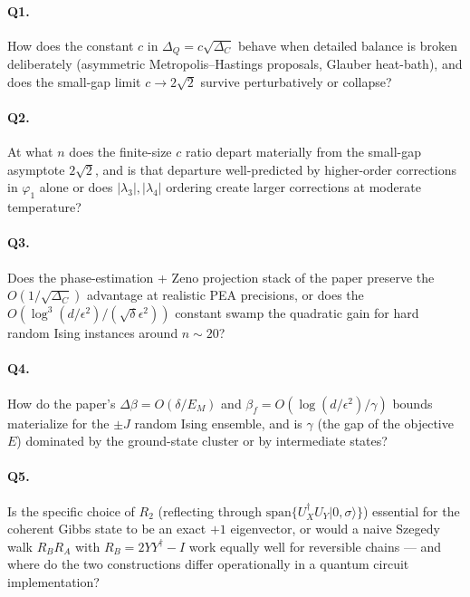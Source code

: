 \documentclass[11pt]{article}
\begin{document}
\paragraph{Q1.} How does the constant $c$ in $\Delta_Q = c\sqrt{\Delta_C}$
behave when detailed balance is broken deliberately (asymmetric
Metropolis--Hastings proposals, Glauber heat-bath), and does the small-gap
limit $c \to 2\sqrt{2}$ survive perturbatively or collapse?

\paragraph{Q2.} At what $n$ does the finite-size $c$ ratio depart materially
from the small-gap asymptote $2\sqrt{2}$, and is that departure well-predicted
by higher-order corrections in $\varphi_1$ alone or does $|\lambda_3|, |\lambda_4|$
ordering create larger corrections at moderate temperature?

\paragraph{Q3.} Does the phase-estimation + Zeno projection stack of the paper
preserve the $O(1/\sqrt{\Delta_C})$ advantage at realistic PEA precisions, or
does the $O(\log^3(d/\epsilon^2)/(\sqrt{\delta}\epsilon^2))$ constant swamp
the quadratic gain for hard random Ising instances around $n \sim 20$?

\paragraph{Q4.} How do the paper's $\Delta\beta = O(\delta/E_M)$ and
$\beta_f = O(\log(d/\epsilon^2)/\gamma)$ bounds materialize for the $\pm J$
random Ising ensemble, and is $\gamma$ (the gap of the objective $E$)
dominated by the ground-state cluster or by intermediate states?

\paragraph{Q5.} Is the specific choice of $R_2$ (reflecting through
$\mathrm{span}\{U_X^\dagger U_Y |0, \sigma\rangle\}$) essential for the
coherent Gibbs state to be an exact $+1$ eigenvector, or would a naive
Szegedy walk $R_B R_A$ with $R_B = 2 Y Y^\dagger - I$ work equally well
for reversible chains --- and where do the two constructions differ
operationally in a quantum circuit implementation?
\end{document}
